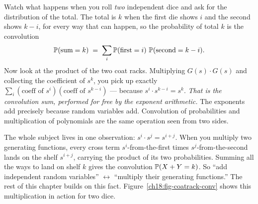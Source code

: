  Watch what happens when you roll \emph{two}
independent dice and ask for the distribution of the total. The total is $k$
when the first die shows $i$ and the second shows $k-i$, for every way that can
happen, so the probability of total $k$ is the convolution
\[
  \P(\text{sum}=k) \;=\; \sum_{i} \P(\text{first}=i)\,\P(\text{second}=k-i).
\]
Now look at the product of the two coat racks. Multiplying $G(s)\cdot G(s)$ and
collecting the coefficient of $s^k$, you pick up exactly
$\sum_i (\text{coeff of }s^i)(\text{coeff of }s^{k-i})$ --- because $s^i \cdot
s^{k-i}=s^k$. \emph{That is the convolution sum, performed for free by the
exponent arithmetic.} The exponents add precisely because random variables add.
Convolution of probabilities and multiplication of polynomials are the same
operation seen from two sides.

\begin{happeningbox}
The whole subject lives in one observation: $s^i\cdot s^j = s^{i+j}$. When you
multiply two generating functions, every cross term $s^i$-from-the-first times
$s^j$-from-the-second lands on the shelf $s^{i+j}$, carrying the product of its
two probabilities. Summing all the ways to land on shelf $k$ gives the
convolution $\P(X+Y=k)$. So ``add independent random variables''
$\longleftrightarrow$ ``multiply their generating functions.'' The rest of this chapter builds on this fact.
Figure~\ref{ch18:fig-coatrack-conv} shows this multiplication in action for two dice.
\end{happeningbox}

